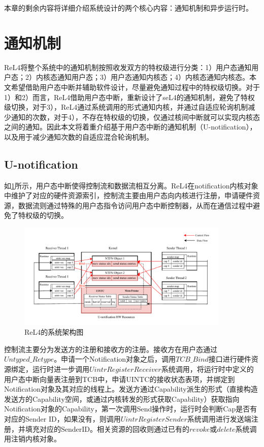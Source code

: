 本章的剩余内容将详细介绍系统设计的两个核心内容：通知机制和异步运行时。
\section{通知机制}

ReL4将整个系统中的通知机制按照收发双方的特权级进行分类：1）用户态通知用户态；2）内核态通知用户态；3）用户态通知内核态；4）内核态通知内核态。本文希望借助用户态中断并辅助软件设计，尽量避免通知过程中的特权级切换。对于1）和2）而言，ReL4借助用户态中断，重新设计了seL4的通知机制，避免了特权级切换，对于3），ReL4通过系统调用的形式通知内核，并通过自适应轮询机制减少通知的次数，对于4），不存在特权级的切换，仅通过核间中断就可以实现内核态之间的通知。因此本文将着重介绍基于用户态中断的通知机制（U-notification），以及用于减少通知次数的自适应混合轮询机制。

\subsection{U-notification}
如\ref{fig:u-notification}所示，用户态中断使得控制流和数据流相互分离。ReL4在notification内核对象中维护了对应的硬件资源索引，控制流主要由用户态向内核进行注册，申请硬件资源，数据流则通过特殊的用户态指令访问用户态中断控制器，从而在通信过程中避免了特权级的切换。

\begin{figure}[htbp]
  \centering
  \includegraphics[width=0.9\textwidth]{figures/uintr_for_ntfn.drawio.pdf}
  \caption{ReL4的系统架构图}\label{fig:u-notification}
\end{figure}

控制流主要分为发送方的注册和接收方的注册。接收方在用户态通过$Untyped\_Retype$。申请一个Notification对象之后，调用$TCB\_Bind$接口进行硬件资源绑定，运行时进一步调用$UintrRegisterReceiver$系统调用，将运行时中定义的用户态中断向量表注册到TCB中，申请UINTC的接收状态表项，并绑定到Notification对象及其对应的线程上。发送方通过Capability派生的形式（直接构造发送方的Capability空间，或通过内核转发的形式获取Capability）获取指向Notification对象的Capability，第一次调用Send操作时，运行时会判断Cap是否有对应的Sender ID，如果没有，则调用$UintrRegisterSender$系统调用进行发送端注册，并填充对应的SenderID。相关资源的回收则通过已有的$revoke$或$delete$系统调用注销内核对象。

